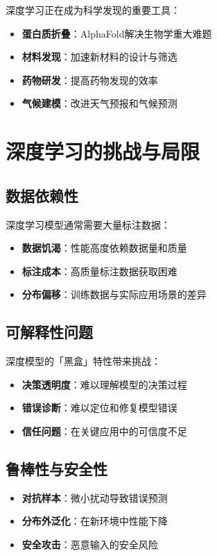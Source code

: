 深度学习正在成为科学发现的重要工具：

\begin{itemize}
\item \textbf{蛋白质折叠}：AlphaFold解决生物学重大难题
\item \textbf{材料发现}：加速新材料的设计与筛选
\item \textbf{药物研发}：提高药物发现的效率
\item \textbf{气候建模}：改进天气预报和气候预测
\end{itemize}

\section{深度学习的挑战与局限}

\subsection{数据依赖性}

深度学习模型通常需要大量标注数据：

\begin{itemize}
\item \textbf{数据饥渴}：性能高度依赖数据量和质量
\item \textbf{标注成本}：高质量标注数据获取困难
\item \textbf{分布偏移}：训练数据与实际应用场景的差异
\end{itemize}

\subsection{可解释性问题}

深度模型的「黑盒」特性带来挑战：

\begin{itemize}
\item \textbf{决策透明度}：难以理解模型的决策过程
\item \textbf{错误诊断}：难以定位和修复模型错误
\item \textbf{信任问题}：在关键应用中的可信度不足
\end{itemize}

\subsection{鲁棒性与安全性}

\begin{itemize}
\item \textbf{对抗样本}：微小扰动导致错误预测
\item \textbf{分布外泛化}：在新环境中性能下降
\item \textbf{安全攻击}：恶意输入的安全风险
\end{itemize}

